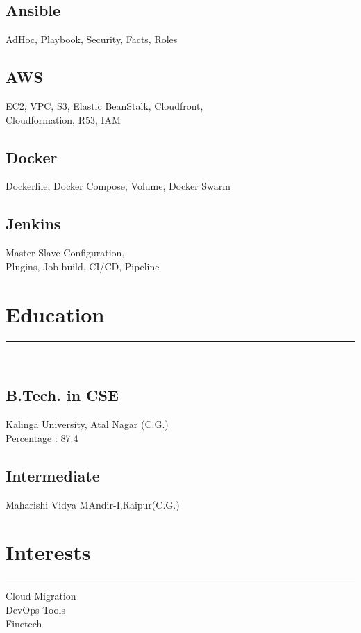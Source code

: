 \documentclass[]{rahulworld-resume}
\begin{document}
\begin{minipage}[t]{0.33\textwidth}
\vspace{6pt}
\subsection{Ansible}
AdHoc, Playbook, Security, Facts, Roles

\vspace{6pt}
\subsection{AWS}
EC2, VPC, S3, Elastic BeanStalk, Cloudfront, \\Cloudformation, R53, IAM

\vspace{6pt}
\subsection{Docker}
Dockerfile, Docker Compose, Volume, Docker Swarm

\vspace{6pt}
\subsection{Jenkins}
Master Slave Configuration, \\Plugins, Job build, CI/CD, Pipeline
\sectionsep
\section{Education} 
\noindent\rule{5cm}{0.4pt}\\
\subsection{B.Tech. in CSE}
Kalinga University, Atal Nagar (C.G.) \\
Percentage : 87.4\\
\vspace{8pt}
\subsection{Intermediate}
Maharishi Vidya MAndir-I,Raipur(C.G.)\\
\sectionsep
\section{Interests}
\noindent\rule{5cm}{0.4pt}

Cloud Migration\\
DevOps Tools\\
Finetech\\

\sectionsep
%
%

\end{minipage} 
\end{document}
